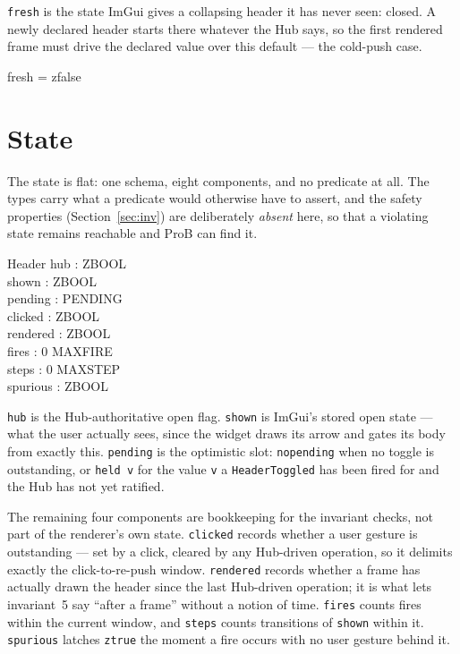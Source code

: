 \documentclass[a4paper,10pt,fleqn]{article}
\begin{document}
\texttt{fresh} is the state ImGui gives a collapsing header it has never seen:
closed.  A newly declared header starts there whatever the Hub says, so the
first rendered frame must drive the declared value over this default --- the
cold-push case.

\begin{zed}
  fresh = zfalse
\end{zed}

\section{State}

The state is flat: one schema, eight components, and no predicate at all.  The
types carry what a predicate would otherwise have to assert, and the safety
properties (Section~\ref{sec:inv}) are deliberately \emph{absent} here, so that
a violating state remains reachable and ProB can find it.

\begin{schema}{Header}
  hub : ZBOOL \\
  shown : ZBOOL \\
  pending : PENDING \\
  clicked : ZBOOL \\
  rendered : ZBOOL \\
  fires : 0 \upto MAXFIRE \\
  steps : 0 \upto MAXSTEP \\
  spurious : ZBOOL
\end{schema}

\texttt{hub} is the Hub-authoritative open flag.  \texttt{shown} is ImGui's
stored open state --- what the user actually sees, since the widget draws its
arrow and gates its body from exactly this.  \texttt{pending} is the
optimistic slot: \texttt{nopending} when no toggle is outstanding, or
\texttt{held~v} for the value \texttt{v} a \texttt{HeaderToggled} has been
fired for and the Hub has not yet ratified.

The remaining four components are bookkeeping for the invariant checks, not
part of the renderer's own state.  \texttt{clicked} records whether a user
gesture is outstanding --- set by a click, cleared by any Hub-driven operation,
so it delimits exactly the click-to-re-push window.  \texttt{rendered} records
whether a frame has actually drawn the header since the last Hub-driven
operation; it is what lets invariant~5 say ``after a frame'' without a notion
of time.  \texttt{fires} counts fires within the current window, and
\texttt{steps} counts transitions of \texttt{shown} within it.
\texttt{spurious} latches \texttt{ztrue} the moment a fire occurs with no user
gesture behind it.
\end{document}
